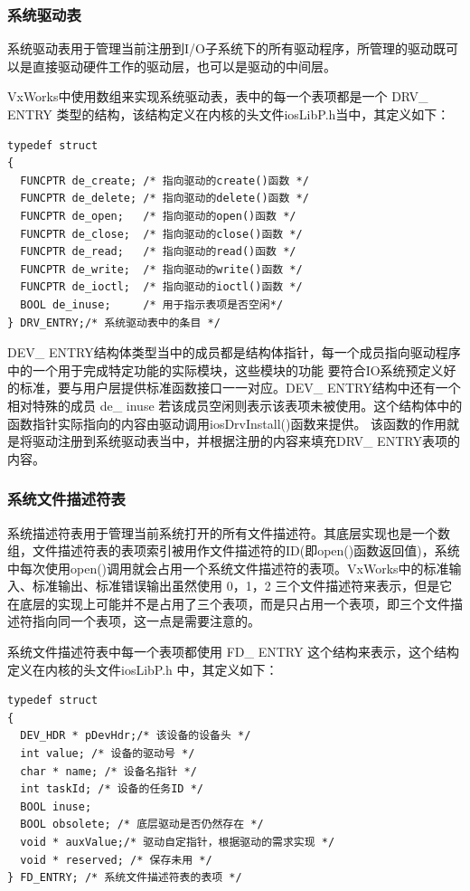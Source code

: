 \subsubsection{系统驱动表}	
	系统驱动表用于管理当前注册到I/O子系统下的所有驱动程序，所管理的驱动既可以是直接驱动硬件工作的驱动层，也可以是驱动的中间层\cite{VxWorks内核解读}\cite{罗国庆2003VxWorks}。
	
	VxWorks中使用数组来实现系统驱动表，表中的每一个表项都是一个 DRV\_ ENTRY 类型的结构，该结构定义在内核的头文件iosLibP.h当中，其定义如下\cite{VxWorks内核解读}：
\lstset{language=C}
\begin{lstlisting}
typedef struct  
{ 
  FUNCPTR de_create; /* 指向驱动的create()函数 */
  FUNCPTR de_delete; /* 指向驱动的delete()函数 */
  FUNCPTR de_open; 	 /* 指向驱动的open()函数 */
  FUNCPTR de_close;  /* 指向驱动的close()函数 */
  FUNCPTR de_read;   /* 指向驱动的read()函数 */
  FUNCPTR de_write;  /* 指向驱动的write()函数 */
  FUNCPTR de_ioctl;  /* 指向驱动的ioctl()函数 */
  BOOL de_inuse;     /* 用于指示表项是否空闲*/
} DRV_ENTRY;/* 系统驱动表中的条目 */ 
\end{lstlisting}

DEV\_ ENTRY结构体类型当中的成员都是结构体指针，每一个成员指向驱动程序中的一个用于完成特定功能的实际模块，这些模块的功能 要符合IO系统预定义好的标准，要与用户层提供标准函数接口一一对应\cite{VxWorks内核解读}\cite{VxWorksDriverAPI}\cite{Wind2003VxWorks}。DEV\_ ENTRY结构中还有一个相对特殊的成员 de\_ inuse 若该成员空闲则表示该表项未被使用。这个结构体中的函数指针实际指向的内容由驱动调用iosDrvInstall()函数来提供。 该函数的作用就是将驱动注册到系统驱动表当中，并根据注册的内容来填充DRV\_ ENTRY表项的内容。


\subsubsection{系统文件描述符表}
	系统描述符表用于管理当前系统打开的所有文件描述符。其底层实现也是一个数组，文件描述符表的表项索引被用作文件描述符的ID(即open()函数返回值)，系统中每次使用open()调用就会占用一个系统文件描述符的表项。VxWorks中的标准输入、标准输出、标准错误输出虽然使用 0，1，2 三个文件描述符来表示，但是它在底层的实现上可能并不是占用了三个表项，而是只占用一个表项，即三个文件描述符指向同一个表项\cite{基于VxWorks的嵌入式实时系统设计}\cite{VxWorks内核解读}\cite{An2003Implementation}，这一点是需要注意的。
		
	
系统文件描述符表中每一个表项都使用 FD\_ ENTRY 这个结构来表示，这个结构定义在内核的头文件iosLibP.h 中，其定义如下\cite{VxWorks内核解读}：
\lstset{language=C}
\begin{lstlisting}
typedef struct  
{ 
  DEV_HDR * pDevHdr;/* 该设备的设备头 */ 
  int value; /* 设备的驱动号 */ 
  char * name; /* 设备名指针 */ 
  int taskId; /* 设备的任务ID */ 
  BOOL inuse;  
  BOOL obsolete; /* 底层驱动是否仍然存在 */ 
  void * auxValue;/* 驱动自定指针，根据驱动的需求实现 */ 
  void * reserved; /* 保存未用 */ 
} FD_ENTRY; /* 系统文件描述符表的表项 */
\end{lstlisting}


